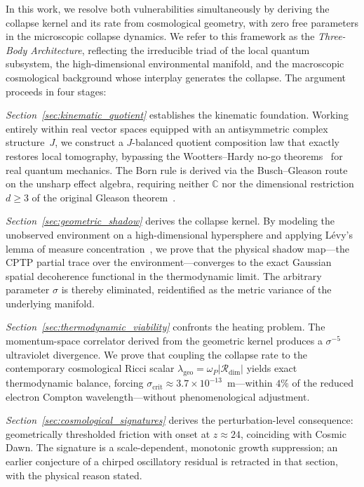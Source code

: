 \documentclass[aps,prd,twocolumn,superscriptaddress,nofootinbib]{revtex4-2}
\theoremstyle{definition}
\theoremstyle{remark}
\newcommand{\C}{\mathbb{C}}
\newcommand{\Rdim}{\mathcal{R}_{\mathrm{dim}}}
\newcommand{\sigcrit}{\sigma_{\mathrm{crit}}}
\newcommand{\lambdageo}{\lambda_{\mathrm{geo}}}
\newcommand{\omegaP}{\omega_P}
\begin{document}
In this work, we resolve both vulnerabilities simultaneously by deriving
the collapse kernel and its rate from cosmological geometry, with zero free
parameters in the microscopic collapse dynamics. We refer to this framework
as the \textit{Three-Body Architecture}, reflecting the irreducible triad
of the local quantum subsystem, the high-dimensional environmental
manifold, and the macroscopic cosmological background whose interplay
generates the collapse. The argument proceeds in four stages:

\textit{Section~\ref{sec:kinematic_quotient}} establishes the kinematic
foundation. Working entirely within real vector spaces equipped with an
antisymmetric complex structure~$J$, we construct a $J$-balanced quotient
composition law that exactly restores local tomography, bypassing the
Wootters--Hardy no-go theorems~\cite{Wootters1990,Hardy2012} for real
quantum mechanics. The Born rule is derived via the Busch--Gleason
route~\cite{Busch2003} on the unsharp effect algebra, requiring neither
$\C$ nor the dimensional restriction $d \geq 3$ of the original Gleason
theorem~\cite{Gleason1957}.

\textit{Section~\ref{sec:geometric_shadow}} derives the collapse kernel.
By modeling the unobserved environment on a high-dimensional hypersphere
and applying L\'evy's lemma of measure concentration~\cite{Levy1951,
MilmanSchechtman1986}, we prove that the physical shadow map---the CPTP
partial trace over the environment---converges to the exact Gaussian
spatial decoherence functional in the thermodynamic limit. The arbitrary
parameter $\sigma$ is thereby eliminated, reidentified as the metric
variance of the underlying manifold.

\textit{Section~\ref{sec:thermodynamic_viability}} confronts the heating
problem. The momentum-space correlator derived from the geometric kernel
produces a $\sigma^{-5}$ ultraviolet divergence. We prove that coupling
the collapse rate to the contemporary cosmological Ricci scalar
$\lambdageo = \omegaP |\Rdim|$ yields exact thermodynamic balance,
forcing $\sigcrit \approx 3.7 \times 10^{-13}$~m---within $4\%$ of the
reduced electron Compton wavelength---without phenomenological
adjustment.

\textit{Section~\ref{sec:cosmological_signatures}} derives the
perturbation-level consequence: geometrically thresholded friction with
onset at $z \approx 24$, coinciding with Cosmic Dawn. The signature is a
scale-dependent, monotonic growth suppression; an earlier conjecture of
a chirped oscillatory residual is retracted in that section, with the
physical reason stated.
\end{document}
